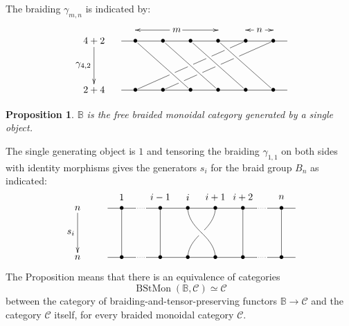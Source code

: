 \documentclass[a4paper,12pt]{article}
\newtheorem*{Proposition}{Proposition}
\theoremstyle{definition}
\theoremstyle{fact}
\theoremstyle{genquest}
\theoremstyle{step}
\newcommand{\BB}{\mathbb{B}}
\newcommand{\BStMon}{\operatorname{BStMon}}
\newcommand{\catC}{\mathcal{C}}
\begin{document}
\medskip\noindent
The braiding $\gamma^{}_{m,n} $ is indicated by:
\[
\xy
(-25,18)*+{4+2};(-25,0)*+{2+4} **\dir{-} \POS?(.5)*+!R{\gamma_{4,2}} ?>*\dir{>};
(5,22)*+{m};(-10,22)*{} **\dir{-} ?>*\dir{>};
(5,22)*+{\hole};(20,22)*{} **\dir{-} ?>*\dir{>};
(35,22)*+{n};(30,22)*{} **\dir{-} ?>*\dir{>};
(35,22)*+{\hole};(40,22)*{} **\dir{-} ?>*\dir{>};
(-15,18);(45,18) **\dir{-};
(-15,0);(45,0) **\dir{-};
(-10,18)*{\bullet}="T1"; 
(0,18)*{\bullet}="T2"; 
(10,18)*{\bullet}="T3"; 
(20,18)*{\bullet}="T4";
(30,18)*{\bullet}="T5";
(40,18)*{\bullet}="T6";
(-10,0)*{\bullet}="B1"; 
(0,0)*{\bullet}="B2"; 
(10,0)*{\bullet}="B3"; 
(20,0)*{\bullet}="B4";
(30,0)*{\bullet}="B5";
(40,0)*{\bullet}="B6";
"T1";"B3" **\crv{} \POS?(.8333)*{\hole}="h" \POS?(.8)*{\hole}="d";
"T2";"B4" **\crv{} \POS?(.6667)*{\hole}="g" \POS?(.75)*{\hole}="c";
"T3";"B5" **\crv{} \POS?(.5)*{\hole}="f" \POS?(.6667)*{\hole}="b";
"T4";"B6" **\crv{} \POS?(.3333)*{\hole}="e" \POS?(.5)*{\hole}="a" ;
"T5";"a" **\crv{};
"a";"b" **\crv{};
"b";"c" **\crv{};
"c";"d" **\crv{};
"d";"B1" **\crv{};
"T6";"e" **\crv{};
"e";"f" **\crv{};
"f";"g" **\crv{};
"g";"h" **\crv{};
"h";"B2" **\crv{};
\endxy
\]

\begin{Proposition} 
$\BB$ is the free braided monoidal category generated by a single object.
\end{Proposition}


\noindent 
The single generating object is $1$ and tensoring the braiding $\gamma^{}_{1,1}$ on both sides with identity morphisms gives the generators $s_i$ for the braid group $B_n$ as indicated:
\[
\xy
(-30,18)*+{n};(-30,0)*+{n} **\dir{-} \POS?(.5)*+!R{s_i} ?>*\dir{>};
(-19,18);(-9,18) **\dir{-};
(-9,18);(-5,18) **\dir{.};
(-5,18);(35,18) **\dir{-};
(35,18);(39,18) **\dir{.};
(39,18);(49,18) **\dir{-};
(-19,0);(-9,0) **\dir{-};
(-9,0);(-5,0) **\dir{.};
(-5,0);(35,0) **\dir{-};
(35,0);(39,0) **\dir{.};
(39,0);(49,0) **\dir{-};
(-14,18)*{\bullet}="T1"+(0,4)*{1};
(0,18)*{\bullet}="T2"+(0,4)*{i-1};
(10,18)*{\bullet}="T3"+(0,4)*{i};
(20,18)*{\bullet}="T4"+(0,4)*{i+1};
(30,18)*{\bullet}="T5"+(0,4)*{i+2};
(44,18)*{\bullet}="T6"+(0,4)*{n};
(-14,0)*{\bullet}="B1"; 
(0,0)*{\bullet}="B2"; 
(10,0)*{\bullet}="B3"; 
(20,0)*{\bullet}="B4";
(30,0)*{\bullet}="B5";
(44,0)*{\bullet}="B6";
"T1";"B1" **\dir{-};
"T2";"B2" **\dir{-};
(15,9)*{\hole}="a";
(15,9)*{}="a'";
"T3";"a'" **\crv{"T3"+(0,-4)&"a'"+(-2,2)};
"T4";"a" **\crv{"T4"+(0,-4)&"a"+(2,2)};
"a";"B3" **\crv{"a"+(-2,-2)&"B3"+(0,4)};
"a'";"B4" **\crv{"a'"+(2,-2)&"B4"+(0,4)};
"T5";"B5" **\dir{-};
"T6";"B6" **\dir{-};
\endxy
\]
The Proposition means that there is an equivalence of categories
\[
\BStMon(\BB,\catC) \simeq \catC
\]
between the category of braiding-and-tensor-preserving functors $\BB \to \catC$ and the category $\catC$ itself, for every braided monoidal category $\catC$.
\end{document}
